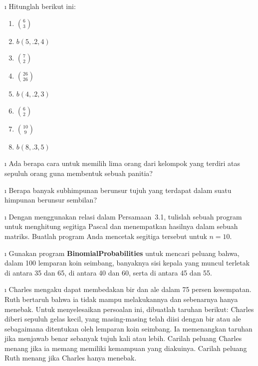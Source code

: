 \exercises
\begin{LJSItem}

\i\label{exer 3.2.1} Hitunglah berikut ini:
\begin{enumerate}
\item ${6 \choose 3}$

\item $b(5,.2,4)$

\item ${7 \choose 2}$

\item ${{26} \choose {26}}$

\item $b(4,.2,3)$

\item ${6 \choose 2}$

\item ${{10} \choose 9}$

\item $b(8, .3, 5)$
\end{enumerate}

\i\label{exer 3.2.2} Ada berapa cara untuk memilih lima orang dari kelompok yang
terdiri atas sepuluh orang guna membentuk sebuah panitia?

\i\label{exer 3.2.3} Berapa banyak subhimpunan berunsur tujuh yang terdapat dalam
suatu himpunan berunsur sembilan?

\i\label{exer 3.2.4} Dengan menggunakan relasi dalam Persamaan~3.1, tulislah sebuah
program untuk menghitung segitiga Pascal dan menempatkan hasilnya dalam sebuah matriks.
Buatlah program Anda mencetak segitiga tersebut untuk $n = 10$.

\i\label{exer 3.2.5} Gunakan program {\bf BinomialProbabilities} untuk mencari peluang
bahwa, dalam 100 lemparan koin seimbang, banyaknya sisi kepala yang muncul terletak di
antara 35 dan 65, di antara 40 dan 60, serta di antara 45 dan 55.

\i\label{exer 3.2.6} Charles mengaku dapat membedakan bir dan ale dalam 75 persen
kesempatan.  Ruth bertaruh bahwa ia tidak mampu melakukannya dan sebenarnya hanya
menebak.  Untuk menyelesaikan persoalan ini, dibuatlah taruhan berikut: Charles diberi
sepuluh gelas kecil, yang masing-masing telah diisi dengan bir atau ale sebagaimana
ditentukan oleh lemparan koin seimbang.  Ia memenangkan taruhan jika menjawab benar
sebanyak tujuh kali atau lebih.  Carilah peluang Charles menang jika ia memang memiliki
kemampuan yang diakuinya.  Carilah peluang Ruth menang jika Charles hanya menebak.


\end{LJSItem}
